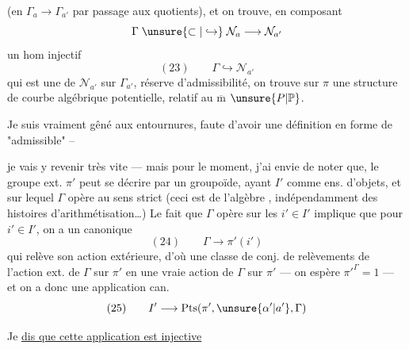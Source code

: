 

(en   $\Gamma_a\longrightarrow\Gamma_{a'}$ par passage
aux quotients), et on trouve, en
composant
\[
\Gamma\;\unsure{\subset|\hookrightarrow}\;\mathcal N_a\longrightarrow\mathcal N_{a'}
\]
un hom  injectif
\[
(23)\qquad\Gamma\hookrightarrow\mathcal N_{a'}
\]
qui est une  de $\mathcal N_{a'}$ sur $\Gamma_{a'}$,
  réserve d'admissibilité,
on trouve sur  $\pi$ une structure
de courbe algébrique potentielle, relatif
au $\overline{\mathrm m}$ $\unsure{P|\mathbb P}$.


 Je suis vraiment gêné
aux entournures, faute d'avoir une
définition en forme de "admissible" --



je vais y revenir très vite --- mais
pour le moment, j'ai envie de noter que,
le groupe ext. $\pi'$ peut se décrire par
un  groupoïde, ayant $I'$ comme ens.
d'objets, et sur lequel $\Gamma$ opère au
sens strict (ceci est de l'algèbre ,
indépendamment des histoires d'arithmétisation\ldots)
Le fait que $\Gamma$ opère 
sur les $i'\in I'$ implique que pour 
$i'\in I'$, on a un 
 canonique
\[
(24)\qquad \Gamma\longrightarrow\pi'(i')
\]
qui relève son action extérieure, d'où
une  classe de conj. de relèvements
de l'action ext. de $\Gamma$ sur $\pi'$
en une vraie action de $\Gamma$ sur $\pi'$
--- on espère   ${\pi'}^{\Gamma}=1$ ---
et on a donc une application can.
\[
(25)\qquad I'\longrightarrow\mathrm{Pts}(\pi',\unsure{\alpha'|a'},\Gamma)
\]



Je \uline{dis que cette application est injective}

